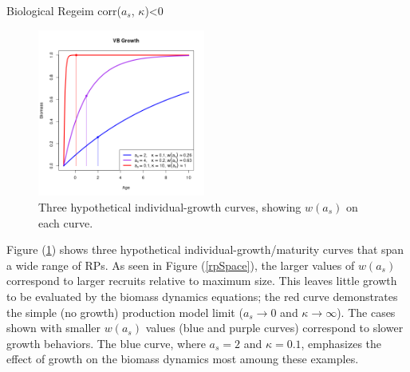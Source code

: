{\color{red} Biological Regeim corr($a_s$, $\kappa$)<0}

\begin{figure}
\vspace{-1.5cm}
\includegraphics[width=0.49\textwidth]{../ddBias/vbCurves.png}
\vspace{-1cm}
\caption{Three hypothetical individual-growth curves, showing $w(a_s)$ on each curve.}\label{vbCurves}
\end{figure}
%
Figure (\ref{vbCurves}) shows three hypothetical individual-growth/maturity curves 
that span a wide range of RPs. As seen in Figure (\ref{rpSpace}), the larger values of
$w(a_s)$ correspond to larger recruits relative to maximum size. This leaves little growth 
to be evaluated by the biomass dynamics equations; the red curve demonstrates the
simple (no growth) production model limit ($a_s\rightarrow0$ and $\kappa\rightarrow\infty$).
The cases shown with smaller $w(a_s)$ values (blue and purple curves) correspond to slower growth %
behaviors. The blue curve, where $a_s=2$ and $\kappa=0.1$, emphasizes the effect of growth 
on the biomass dynamics most amoung these examples. 

